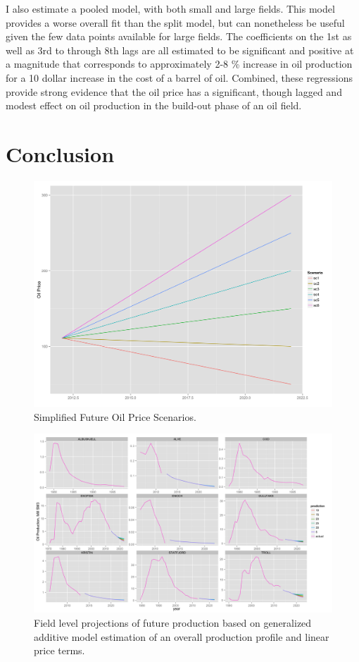 \documentclass[12pt]{article}
\begin{document}
I also estimate a pooled model, with both small and large fields.  This model provides a worse overall fit than the split model, but can nonetheless be useful given the few data points available for large fields.  The coefficients on the 1st as well as 3rd to through 8th lags are all estimated to be significant and positive at a magnitude that corresponds to approximately 2-8 \% increase in oil production for a 10 dollar increase in the cost of a barrel of oil.  Combined, these regressions provide strong evidence that the oil price has a significant, though lagged and modest effect on oil production in the build-out phase of an oil field.

\section{Conclusion}

\begin{figure}
	\includegraphics[width=1\textwidth]{figures/price_scenario_print.png}
	\caption{Simplified Future Oil Price Scenarios.}
	\label{price_scenario}
\end{figure}

\begin{figure}
	\includegraphics[width=1\textwidth]{figures/field_lev_forecast_print.png}
	\caption{Field level projections of future production based on generalized additive model estimation of an overall production profile and linear price terms.}
	\label{field_lev_forecast}
\end{figure}
\end{document}
